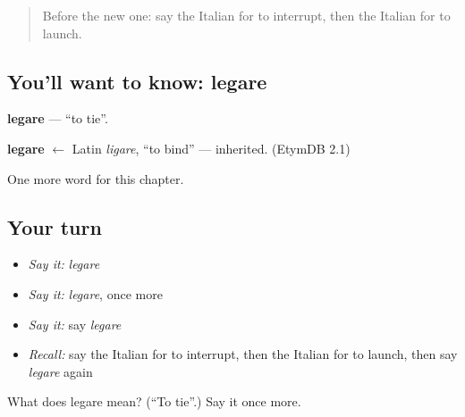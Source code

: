 \label{lesson:IT-C183-legare}



\begin{quote}
Before the new one: say the Italian for to interrupt, then the Italian for to launch.
\end{quote}

\subsection*{You'll want to know: legare}
\textbf{legare} — \textquotedblleft{}to tie\textquotedblright{}.

\begin{cousinweb}
\textbf{legare} $\leftarrow$ Latin \emph{ligare}, \textquotedblleft{}to bind\textquotedblright{} — inherited. (EtymDB 2.1)
\end{cousinweb}

\begin{grammarlens}[title={What you've built}]
One more word for this chapter.
\end{grammarlens}

\subsection*{Your turn}
\begin{itemize}
\raggedright
  \item \emph{Say it:} \emph{legare}
  \item \emph{Say it:} \emph{legare}, once more
  \item \emph{Say it:} say \emph{legare}
  \item \emph{Recall:} say the Italian for to interrupt, then the Italian for to launch, then say \emph{legare} again
\end{itemize}

\begin{tcolorbox}[breakable,colback=teal!4,colframe=teal!35!black,title={Before you move on}]
What does legare mean? (\textquotedblleft{}To tie\textquotedblright{}.) Say it once more.
\end{tcolorbox}
